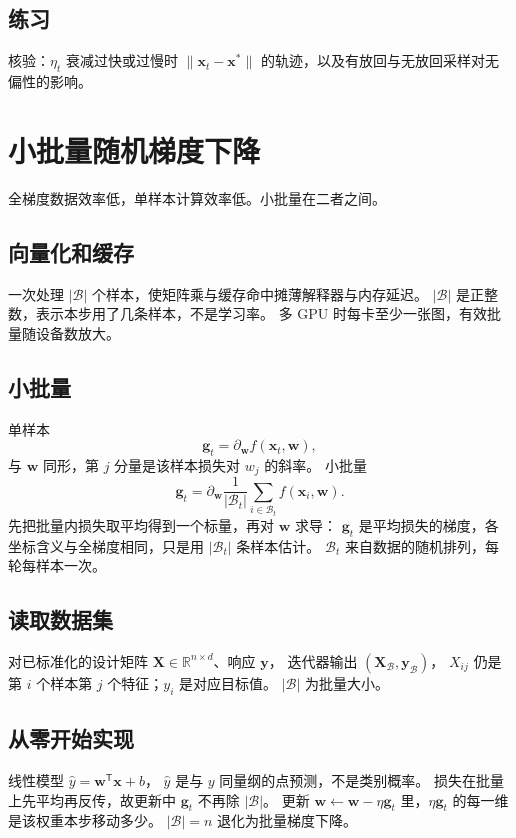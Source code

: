 \subsection{练习}

核验：$\eta_t$ 衰减过快或过慢时 $\|\bm{x}_t-\bm{x}^{\ast}\|$ 的轨迹，以及有放回与无放回采样对无偏性的影响。

\section{小批量随机梯度下降}

全梯度数据效率低，单样本计算效率低。小批量在二者之间。

\subsection{向量化和缓存}

一次处理 $|\mathcal{B}|$ 个样本，使矩阵乘与缓存命中摊薄解释器与内存延迟。
$|\mathcal{B}|$ 是正整数，表示本步用了几条样本，不是学习率。
多 GPU 时每卡至少一张图，有效批量随设备数放大。

\subsection{小批量}

单样本
\[
\bm{g}_t=\partial_{\bm{w}}f(\bm{x}_t,\bm{w}),
\]
与 $\bm{w}$ 同形，第 $j$ 分量是该样本损失对 $w_j$ 的斜率。
小批量
\[
\bm{g}_t
=
\partial_{\bm{w}}
\frac{1}{|\mathcal{B}_t|}
\sum_{i\in\mathcal{B}_t}f(\bm{x}_i,\bm{w}).
\]
先把批量内损失取平均得到一个标量，再对 $\bm{w}$ 求导：
$\bm{g}_t$ 是平均损失的梯度，各坐标含义与全梯度相同，只是用 $|\mathcal{B}_t|$ 条样本估计。
$\mathcal{B}_t$ 来自数据的随机排列，每轮每样本一次。

\subsection{读取数据集}

对已标准化的设计矩阵 $\bm{X}\in\mathbb{R}^{n\times d}$、响应 $\bm{y}$，
迭代器输出 $(\bm{X}_{\mathcal{B}},\bm{y}_{\mathcal{B}})$，
$X_{ij}$ 仍是第 $i$ 个样本第 $j$ 个特征；$y_i$ 是对应目标值。
$|\mathcal{B}|$ 为批量大小。

\subsection{从零开始实现}

线性模型 $\hat{y}=\bm{w}^{\mathsf T}\bm{x}+b$，
$\hat{y}$ 是与 $y$ 同量纲的点预测，不是类别概率。
损失在批量上先平均再反传，故更新中 $\bm{g}_t$ 不再除 $|\mathcal{B}|$。
更新 $\bm{w}\leftarrow\bm{w}-\eta\bm{g}_t$ 里，$\eta\bm{g}_t$ 的每一维是该权重本步移动多少。
$|\mathcal{B}|=n$ 退化为批量梯度下降。

